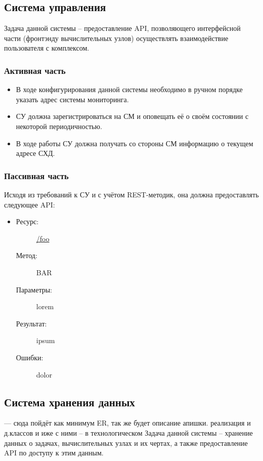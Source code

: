 \documentclass[a4paper,12pt]{report}
\numberwithin{equation}{section}
\begin{document}
\subsection{Система управления}
Задача данной системы -- предоставление API, позволяющего интерфейсной части (фронтэнду вычислительных узлов) осуществлять взаимодействие пользователя с комплексом.

\subsubsection{Активная часть}
\begin{itemize}
  \item В ходе конфигурирования данной системы необходимо в ручном порядке указать адрес системы мониторинга.
  \item СУ должна зарегистрироваться на СМ и оповещать её о своём состоянии с некоторой периодичностью.
  \item В ходе работы СУ должна получать со стороны СМ информацию о текущем адресе СХД.
\end{itemize}

\subsubsection{Пассивная часть}
Исходя из требований к СУ и с учётом REST-методик, она должна предоставлять следующее API:

\begin{itemize}
  \item
  \begin{description}
    \item[Ресурс:] \url{/foo}
    \item[Метод:] BAR
    \item[Параметры:] lorem
    \item[Результат:] ipsum
    \item[Ошибки:] dolor
  \end{description}
\end{itemize}

\subsection{Система хранения данных}
--- сюда пойдёт как минимум ER, так же будет описание апишки. реализация и д.классов и иже с ними -- в технологическом
Задача данной системы -- хранение данных о задачах, вычислительных узлах и их чертах, а также предоставление API по доступу к этим данным.
\end{document}
